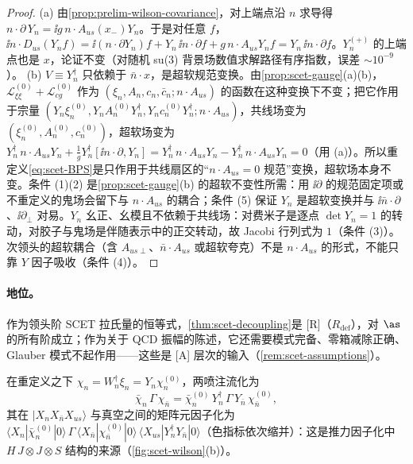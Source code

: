 \begin{proof}
(a) 由\cref{prop:prelim-wilson-covariance}，对上端点沿 $n$ 求导得 $n\cdot\partial\,Y_n=\ii g\,n\cdot A_{us}(x_-)Y_n$。于是对任意 $f$，
$\ii n\cdot D_{us}(Y_nf)=\ii(n\cdot\partial Y_n)f+Y_n\,\ii n\cdot\partial f+g\,n\cdot A_{us}Y_nf=Y_n\,\ii n\cdot\partial f$。$Y_n^{(+)}$ 的上端点也是 $x$，论证不变（对随机 su(3) 背景场数值求解路径有序指数，误差 $\sim10^{-9}$）。%
(b) $V\equiv Y_n^\dagger$ 只依赖于 $\bar n\cdot x$，是超软规范变换。由\cref{prop:scet-gauge}(a)(b)，$\mathcal L^{(0)}_{\xi\xi}+\mathcal L^{(0)}_{cg}$ 作为 $(\xi_n,A_n,c_n,\bar c_n;n\cdot A_{us})$ 的函数在这种变换下不变；把它作用于宗量 $(Y_n\xi^{(0)}_n,Y_nA^{(0)}_nY_n^\dagger,Y_nc^{(0)}_nY_n^\dagger;n\cdot A_{us})$，共线场变为 $(\xi^{(0)}_n,A^{(0)}_n,c^{(0)}_n)$，超软场变为
$Y_n^\dagger\,n\cdot A_{us}Y_n+\frac1gY_n^\dagger[\ii n\cdot\partial,Y_n]=Y_n^\dagger\,n\cdot A_{us}Y_n-Y_n^\dagger\,n\cdot A_{us}Y_n=0$（用 (a)）。所以重定义\cref{eq:scet-BPS}是只作用于共线扇区的“$n\cdot A_{us}=0$ 规范”变换，超软场本身不变。条件 (1)(2) 是\cref{prop:scet-gauge}(b) 的超软不变性所需：用 $\ii\partial$ 的规范固定项或不重定义的鬼场会留下与 $n\cdot A_{us}$ 的耦合；条件 (5) 保证 $Y_n$ 是超软变换并与 $\ii\bar n\cdot\partial$、$\ii\partial_\perp$ 对易。$Y_n$ 幺正、幺模且不依赖于共线场：对费米子是逐点 $\det Y_n=1$ 的转动，对胶子与鬼场是伴随表示中的正交转动，故 Jacobi 行列式为 $1$（条件 (3)）。次领头的超软耦合（含 $A_{us\perp}$、$\bar n\cdot A_{us}$ 或超软夸克）不是 $n\cdot A_{us}$ 的形式，不能只靠 $Y$ 因子吸收\cite{BauerPirjolStewart2002}（条件 (4)）。
\end{proof}

\paragraph{地位。}作为领头阶 SCET 拉氏量的恒等式，\cref{thm:scet-decoupling}是 [R]（$R_{\mathrm{def}}$），对 $\as$ 的所有阶成立；作为关于 QCD 振幅的陈述，它还需要模式完备、零箱减除正确、Glauber 模式不起作用——这些是 [A] 层次的输入（\cref{rem:scet-assumptions}）。

在重定义之下 $\chi_n=W_n^\dagger\xi_n=Y_n\chi^{(0)}_n$，两喷注流化为
\begin{equation}\label{eq:scet-JY}
\bar\chi_n\,\Gamma\,\chi_{\bar n}=\bar\chi^{(0)}_n\,Y_n^\dagger\,\Gamma\,Y_{\bar n}\,\chi^{(0)}_{\bar n},
\end{equation}
其在 $|X_nX_{\bar n}X_{us}\rangle$ 与真空之间的矩阵元因子化为 $\langle X_n|\bar\chi^{(0)}_n|0\rangle\,\Gamma\,\langle X_{\bar n}|\chi^{(0)}_{\bar n}|0\rangle\,\langle X_{us}|Y_n^\dagger Y_{\bar n}|0\rangle$（色指标依次缩并）：这是推力因子化中 $H\,J\otimes J\otimes S$ 结构的来源（\cref{fig:scet-wilson}(b)）。

